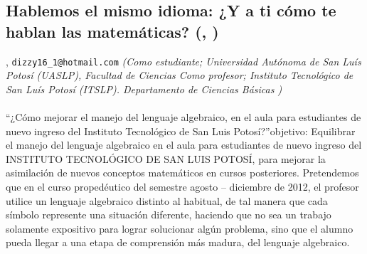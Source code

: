 \subsection{\sffamily Hablemos el mismo idioma: ¿Y a ti cómo te hablan las matemáticas? {\footnotesize (, )}} \label{reg-1555} 
, {\tt dizzy16_1@hotmail.com}  {\slshape (Como estudiante; Universidad Autónoma de San Luís Potosí (UASLP), Facultad de Ciencias Como profesor; Instituto Tecnológico de San Luís Potosí (ITSLP). Departamento de Ciencias Básicas )}\\
\\
\noindent “¿Cómo mejorar el manejo del lenguaje algebraico, en el aula para estudiantes de nuevo ingreso del Instituto Tecnológico de San Luis Potosí?”objetivo: Equilibrar el manejo del lenguaje algebraico en el aula para estudiantes de nuevo ingreso del INSTITUTO TECNOLÓGICO DE SAN LUIS POTOSÍ, para mejorar la asimilación de nuevos conceptos matemáticos en cursos posteriores. Pretendemos que en el curso propedéutico del semestre agosto – diciembre de 2012, el profesor utilice un lenguaje algebraico distinto al habitual, de tal manera que cada símbolo represente una situación diferente, haciendo que no sea un trabajo solamente expositivo para lograr solucionar algún problema, sino que el alumno pueda llegar a una etapa de comprensión más madura, del lenguaje algebraico.
